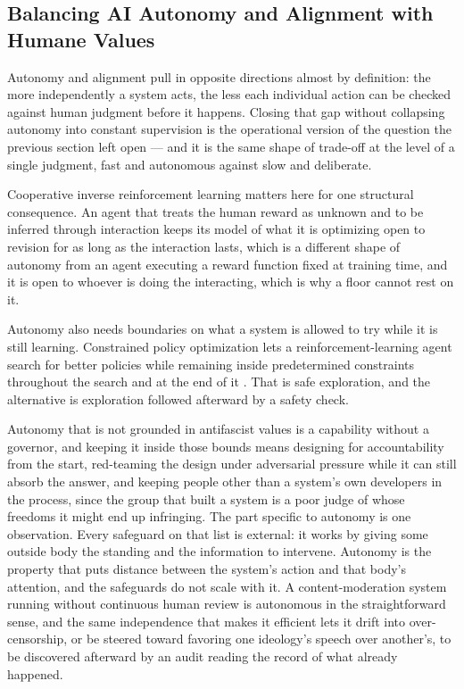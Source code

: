 \subsection{Balancing AI Autonomy and Alignment with Humane Values}
\label{sec:5.6.2}
Autonomy and alignment pull in opposite directions almost by definition: the more independently a system acts, the less each individual action can be checked against human judgment before it happens. Closing that gap without collapsing autonomy into constant supervision is the operational version of the question the previous section left open — and it is the same shape of trade-off at the level of a single judgment, fast and autonomous against slow and deliberate.

Cooperative inverse reinforcement learning matters here for one structural consequence. An agent that treats the human reward as unknown and to be inferred through interaction keeps its model of what it is optimizing open to revision for as long as the interaction lasts, which is a different shape of autonomy from an agent executing a reward function fixed at training time, and it is open to whoever is doing the interacting, which is why a floor cannot rest on it.

Autonomy also needs boundaries on what a system is allowed to try while it is still learning. Constrained policy optimization lets a reinforcement-learning agent search for better policies while remaining inside predetermined constraints throughout the search and at the end of it \autocite{achiam2017constrained}. That is safe exploration, and the alternative is exploration followed afterward by a safety check.

Autonomy that is not grounded in antifascist values is a capability without a governor, and keeping it inside those bounds means designing for accountability from the start, red-teaming the design under adversarial pressure while it can still absorb the answer, and keeping people other than a system's own developers in the process, since the group that built a system is a poor judge of whose freedoms it might end up infringing. The part specific to autonomy is one observation. Every safeguard on that list is external: it works by giving some outside body the standing and the information to intervene. Autonomy is the property that puts distance between the system's action and that body's attention, and the safeguards do not scale with it. A content-moderation system running without continuous human review is autonomous in the straightforward sense, and the same independence that makes it efficient lets it drift into over-censorship, or be steered toward favoring one ideology's speech over another's, to be discovered afterward by an audit reading the record of what already happened.

